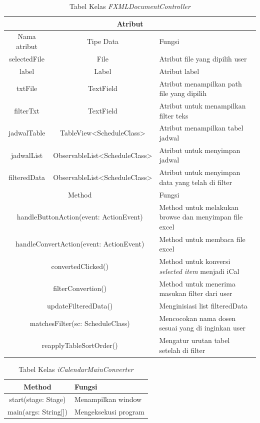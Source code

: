 \begin{table}[H]
	\centering
		\caption{Tabel Kelas \textit{FXMLDocumentController}}
		\label{tab:FXMLDocumentController}
		\begin{tabular}{ | c | c | p{4cm} |}
			\hline
				\multicolumn{3}{|c|}{Atribut} \\ \hline 
				Nama atribut & Tipe Data  & Fungsi \\ \hline
				selectedFile & File & Atribut file yang dipilih user\\ \hline
				label & Label & Atribut label\\ \hline
				txtFile & TextField & Atribut menampilkan path file yang dipilih\\ \hline
				filterTxt & TextField & Atribut untuk menampilkan filter teks\\ \hline
				jadwalTable & TableView<ScheduleClass> & Atribut menampilkan tabel jadwal\\ \hline
				jadwalList & ObservableList<ScheduleClass> & Atribut untuk menyimpan jadwal\\ \hline
				filteredData & ObservableList<ScheduleClass> & Atribut untuk menyimpan data yang telah di filter\\ \hline
				\multicolumn{2}{|c|}{Method} & Fungsi \\ \hline
				\multicolumn{2}{|c|}{handleButtonAction(event: ActionEvent)} & Method untuk melakukan browse dan menyimpan file excel\\ \hline
				\multicolumn{2}{|c|}{handleConvertAction(event: ActionEvent)} & Method untuk membaca file excel \\ \hline
				\multicolumn{2}{|c|}{convertedClicked()} & Method untuk konversi \textit{selected item} menjadi iCal  \\ \hline
				\multicolumn{2}{|c|}{filterConvertion()} & Method untuk menerima masukan filter dari user \\ \hline
				\multicolumn{2}{|c|}{updateFilteredData()} & Menginisiasi list filteredData \\ \hline
				\multicolumn{2}{|c|}{matchesFilter(sc: ScheduleClass)} & Mencocokan nama dosen sesuai yang di inginkan user \\ \hline
				\multicolumn{2}{|c|}{reapplyTableSortOrder()} & Mengatur urutan tabel setelah di filter \\ \hline
		\end{tabular}
\end{table}

\begin{table}[H]
	\centering
		\caption{Tabel Kelas \textit{iCalendarMainConverter}}
		\label{tab:iCalendarMainConverter}
		\begin{tabular}{ | c | c | p{4cm} |}
			\hline
				\multicolumn{2}{|c|}{Method} & Fungsi \\ \hline
				\multicolumn{2}{|c|}{start(stage: Stage)} & Menampilkan window\\ \hline
			\multicolumn{2}{|c|}{main(args: String[])} & Mengeksekusi program\\ \hline
		\end{tabular}
\end{table}

